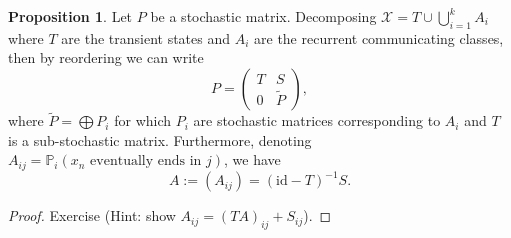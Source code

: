 \documentclass[]{article}
\theoremstyle{definition}
\theoremstyle{definition}
\newtheorem{proposition}{Proposition}[section]
\begin{document}
\begin{proposition}
  Let \(P\) be a stochastic matrix. Decomposing 
  \(\mathcal{X} = T \cup \bigcup_{i = 1}^k A_i\) where \(T\) are the transient 
  states and \(A_i\) are the recurrent communicating classes, then by reordering 
  we can write
  \[P = \begin{pmatrix}
    T & S\\ 
    0 & \tilde P
  \end{pmatrix},\]
  where \(\tilde P = \bigoplus P_i\) for which \(P_i\) are stochastic matrices 
  corresponding to \(A_i\) and \(T\) is a sub-stochastic matrix. Furthermore,
  denoting \(A_{ij} = \mathbb{P}_i(x_n \text{ eventually ends in } j)\), we 
  have 
  \[A := (A_{ij}) = (\text{id} - T)^{-1}S.\]
\end{proposition}
\begin{proof}
  Exercise (Hint: show \(A_{ij} = (TA)_{ij} + S_{ij}\)).
\end{proof}
\end{document}
